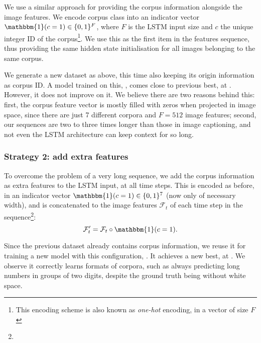 			We use a similar approach for providing the corpus information alongside the image features. We encode corpus class into an indicator vector \(\mathbbm{1}(c = 1) \in \{0, 1\}^F\), where \(F\) is the LSTM input size and \(c\) the unique integer ID of the corpus\footnote{This encoding scheme is also known as \emph{one-hot} encoding, in a vector of size \(F\)}. We use this as the first item in the features sequence, thus providing the same hidden state initialisation for all images belonging to the same corpus.

			We generate a new dataset as above, this time also keeping its origin information as corpus ID. A model trained on this, , comes close to previous best, at . However, it does not improve on it. We believe there are two reasons behind this: first, the corpus feature vector is mostly filled with zeros when projected in image space, since there are just 7 different corpora and \(F = 512\) image features; second, our sequences are two to three times longer than those in image captioning, and not even the LSTM architecture can keep context for so long.

		\subsubsection*{Strategy 2: add extra features}
			To overcome the problem of a very long sequence, we add the corpus information as extra features to the LSTM input, at all time steps. This is encoded as before, in an indicator vector \(\mathbbm{1}(c = 1) \in \{0,1\}^7\) (now only of necessary width), and is concatenated to the image features \(\mathcal{F}_t\) of each time step in the sequence\footnote{}:\[
				\mathcal{F}'_t = \mathcal{F}_t \circ \mathbbm{1}(c = 1).
			\]

			Since the previous dataset already contains corpus information, we reuse it for training a new model with this configuration, . It achieves a new best, at . We observe it correctly learns formats of corpora, such as always predicting long numbers in groups of two digits, despite the ground truth being without white space.


